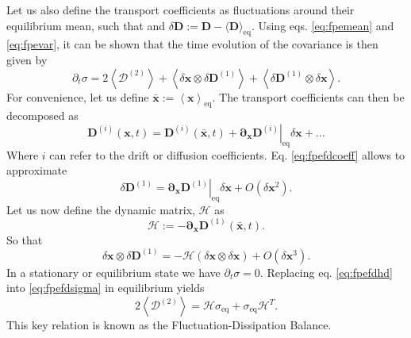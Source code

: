 \documentclass[ twoside,openright,titlepage,numbers=noenddot,%
headinclude,footinclude,cleardoublepage=empty,abstract=on,
BCOR=5mm,paper=a4,fontsize=11pt, dvipsnames
]{scrreprt}
\renewcommand{\vec}[1]{\bm{#1}}
\newcommand{\tens}[1]{\bm{\mathcal{#1}}}
\begin{document}
Let us also define the transport coefficients as fluctuations around their equilibrium mean, such that and $\delta\vec{D} := \vec{D} - \langle\vec{D}\rangle_{\text{eq}}$.
Using eqs. \eqref{eq:fpemean} and \eqref{eq:fpevar}, it can be shown that the time evolution of the covariance is then given by
\begin{equation}
  \label{eq:fpefdsigma}
 \partial_t\tens{\sigma} = 2\left\langle\tens{D}^{(2)} \right\rangle + \left\langle \delta\vec{x}\otimes\delta\vec{D}^{(1)} \right\rangle + \left\langle \delta\vec{D}^{(1)}\otimes\delta\vec{x} \right\rangle.
\end{equation}
For convenience, let us define $\bar{\vec{x}}:=\left\langle\vec{x}\right\rangle_{\text{eq}}$.
The transport coefficients can then be decomposed as
\begin{equation}
  \label{eq:fpefdcoeff}
  \vec{D}^{(i)}(\vec{x}, t) = \vec{D}^{(i)}(\bar{\vec{x}}, t) + \left.\vec{\partial}_{\vec{x}}\vec{D}^{(i)}\right|_{\text{eq}}\delta\vec{x}+\dots
\end{equation}
Where $i$ can refer to the drift or diffusion coefficients.
Eq. \eqref{eq:fpefdcoeff} allows to approximate
\begin{equation}
  \delta\vec{D}^{(1)} = \left.\vec{\partial}_{\vec{x}}\vec{D}^{(1)}\right|_{\text{eq}}\delta\vec{x} + O\left(\delta\vec{x}^2\right).
\end{equation}
Let us now define the dynamic matrix, $\tens{H}$ as
\begin{equation}
  \tens{H} := -\vec{\partial}_{\vec{x}}\vec{D}^{(1)}(\bar{\vec{x}},t).
\end{equation}
So that
\begin{equation}
  \label{eq:fpefdhd}
  \delta\vec{x}\otimes\delta\vec{D}^{(1)} = -\tens{H}\left(\delta\vec{x}\otimes\delta\vec{x}\right) + O\left(\delta\vec{x}^3\right).
\end{equation}
In a stationary or equilibrium state we have $\partial_t\tens{\sigma} = 0$. Replacing eq. \eqref{eq:fpefdhd} into \eqref{eq:fpefdsigma} in equilibrium yields
\begin{equation}
  \label{eq:fpefdbal}
  2\left\langle\tens{D}^{(2)}\right\rangle = \tens{H}\tens{\sigma}_{\text{eq}} + \tens{\sigma}_{\text{eq}}\tens{H}^T.
\end{equation}
This key relation is known as the Fluctuation-Dissipation Balance.
\end{document}
